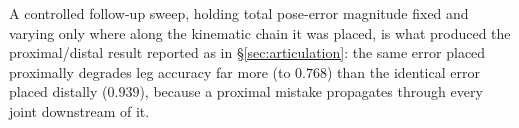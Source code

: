 A controlled follow-up sweep, holding total pose-error magnitude fixed and
varying only where along the kinematic chain it was placed, is what produced
the proximal/distal result reported as  in \S\ref{sec:articulation}:
the same error placed proximally degrades leg accuracy far more (to $0.768$)
than the identical error placed distally ($0.939$), because a proximal
mistake propagates through every joint downstream of it.
